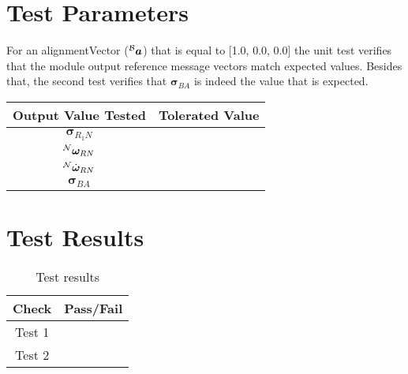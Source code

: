 \section{Test Parameters}

For an alignmentVector ($^{\cal B}{\bm a}$) that is equal to [1.0, 0.0, 0.0] the unit test verifies that the module output reference message vectors match expected values. Besides that, the second test verifies that ${\bm \sigma}_{BA}$ is indeed the value that is expected.

\begin{table}[ht]
\centering
\begin{tabular}{cc}
\hline
\hline
\textbf{Output Value Tested}     & \textbf{Tolerated Value} \\ \hline
${\bm \sigma}_{R_{1}N}$          &                     \\
$^{\cal N}{\bm \omega}_{RN}$     &                      \\
$^{\cal N}\dot{\bm \omega}_{RN}$ &                      \\ 
${\bm \sigma}_{BA}$ &   \\ \hline
\hline
\end{tabular}
\end{table}

\section{Test Results}

\begin{table}[H]
	\caption{Test results}
	\label{tab:results}
	\centering \fontsize{10}{10}\selectfont
	\begin{tabular}{c | c}
		\hline\hline
		\textbf{Check} 						  		&\textbf{Pass/Fail} \\ 
		\hline
	   Test 1	   			&  \\ 
	   Test 2	   			&  \\ 
	   \hline\hline
	\end{tabular}
\end{table}